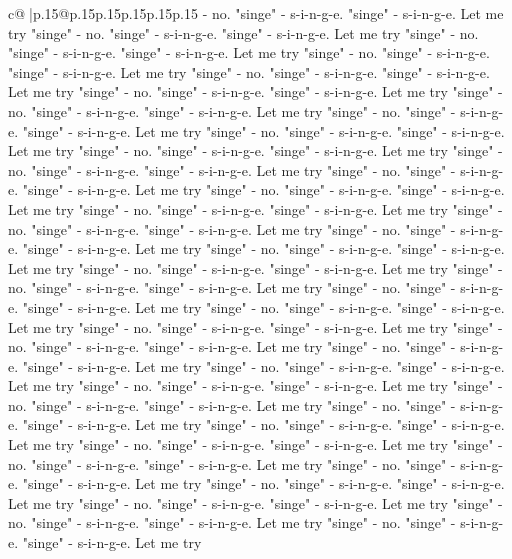 \documentclass{article}
\begin{document}
{\begin{supertabular}{c@{$\;$}|p{.15\linewidth}@{}p{.15\linewidth}p{.15\linewidth}p{.15\linewidth}p{.15\linewidth}p{.15\linewidth}}
{{{{-} no. "singe" {-} s{-}i{-}n{-}g{-}e. "singe" {-} s{-}i{-}n{-}g{-}e. Let me try "singe" {-} no. "singe" {-} s{-}i{-}n{-}g{-}e. "singe" {-} s{-}i{-}n{-}g{-}e. Let me try "singe" {-} no. "singe" {-} s{-}i{-}n{-}g{-}e. "singe" {-} s{-}i{-}n{-}g{-}e. Let me try "singe" {-} no. "singe" {-} s{-}i{-}n{-}g{-}e. "singe" {-} s{-}i{-}n{-}g{-}e. Let me try "singe" {-} no. "singe" {-} s{-}i{-}n{-}g{-}e. "singe" {-} s{-}i{-}n{-}g{-}e. Let me try "singe" {-} no. "singe" {-} s{-}i{-}n{-}g{-}e. "singe" {-} s{-}i{-}n{-}g{-}e. Let me try "singe" {-} no. "singe" {-} s{-}i{-}n{-}g{-}e. "singe" {-} s{-}i{-}n{-}g{-}e. Let me try "singe" {-} no. "singe" {-} s{-}i{-}n{-}g{-}e. "singe" {-} s{-}i{-}n{-}g{-}e. Let me try "singe" {-} no. "singe" {-} s{-}i{-}n{-}g{-}e. "singe" {-} s{-}i{-}n{-}g{-}e. Let me try "singe" {-} no. "singe" {-} s{-}i{-}n{-}g{-}e. "singe" {-} s{-}i{-}n{-}g{-}e. Let me try "singe" {-} no. "singe" {-} s{-}i{-}n{-}g{-}e. "singe" {-} s{-}i{-}n{-}g{-}e. Let me try "singe" {-} no. "singe" {-} s{-}i{-}n{-}g{-}e. "singe" {-} s{-}i{-}n{-}g{-}e. Let me try "singe" {-} no. "singe" {-} s{-}i{-}n{-}g{-}e. "singe" {-} s{-}i{-}n{-}g{-}e. Let me try "singe" {-} no. "singe" {-} s{-}i{-}n{-}g{-}e. "singe" {-} s{-}i{-}n{-}g{-}e. Let me try "singe" {-} no. "singe" {-} s{-}i{-}n{-}g{-}e. "singe" {-} s{-}i{-}n{-}g{-}e. Let me try "singe" {-} no. "singe" {-} s{-}i{-}n{-}g{-}e. "singe" {-} s{-}i{-}n{-}g{-}e. Let me try "singe" {-} no. "singe" {-} s{-}i{-}n{-}g{-}e. "singe" {-} s{-}i{-}n{-}g{-}e. Let me try "singe" {-} no. "singe" {-} s{-}i{-}n{-}g{-}e. "singe" {-} s{-}i{-}n{-}g{-}e. Let me try "singe" {-} no. "singe" {-} s{-}i{-}n{-}g{-}e. "singe" {-} s{-}i{-}n{-}g{-}e. Let me try "singe" {-} no. "singe" {-} s{-}i{-}n{-}g{-}e. "singe" {-} s{-}i{-}n{-}g{-}e. Let me try "singe" {-} no. "singe" {-} s{-}i{-}n{-}g{-}e. "singe" {-} s{-}i{-}n{-}g{-}e. Let me try "singe" {-} no. "singe" {-} s{-}i{-}n{-}g{-}e. "singe" {-} s{-}i{-}n{-}g{-}e. Let me try "singe" {-} no. "singe" {-} s{-}i{-}n{-}g{-}e. "singe" {-} s{-}i{-}n{-}g{-}e. Let me try "singe" {-} no. "singe" {-} s{-}i{-}n{-}g{-}e. "singe" {-} s{-}i{-}n{-}g{-}e. Let me try "singe" {-} no. "singe" {-} s{-}i{-}n{-}g{-}e. "singe" {-} s{-}i{-}n{-}g{-}e. Let me try "singe" {-} no. "singe" {-} s{-}i{-}n{-}g{-}e. "singe" {-} s{-}i{-}n{-}g{-}e. Let me try "singe" {-} no. "singe" {-} s{-}i{-}n{-}g{-}e. "singe" {-} s{-}i{-}n{-}g{-}e. Let me try "singe" {-} no. "singe" {-} s{-}i{-}n{-}g{-}e. "singe" {-} s{-}i{-}n{-}g{-}e. Let me try "singe" {-} no. "singe" {-} s{-}i{-}n{-}g{-}e. "singe" {-} s{-}i{-}n{-}g{-}e. Let me try "singe" {-} no. "singe" {-} s{-}i{-}n{-}g{-}e. "singe" {-} s{-}i{-}n{-}g{-}e. Let me try "singe" {-} no. "singe" {-} s{-}i{-}n{-}g{-}e. "singe" {-} s{-}i{-}n{-}g{-}e. Let me try "singe" {-} no. "singe" {-} s{-}i{-}n{-}g{-}e. "singe" {-} s{-}i{-}n{-}g{-}e. Let me try "singe" {-} no. "singe" {-} s{-}i{-}n{-}g{-}e. "singe" {-} s{-}i{-}n{-}g{-}e. Let me try "singe" {-} no. "singe" {-} s{-}i{-}n{-}g{-}e. "singe" {-} s{-}i{-}n{-}g{-}e. Let me try "singe" {-} no. "singe" {-} s{-}i{-}n{-}g{-}e. "singe" {-} s{-}i{-}n{-}g{-}e. Let me try "singe" {-} no. "singe" {-} s{-}i{-}n{-}g{-}e. "singe" {-} s{-}i{-}n{-}g{-}e. Let me try }}}
\end{supertabular}}
\end{document}
